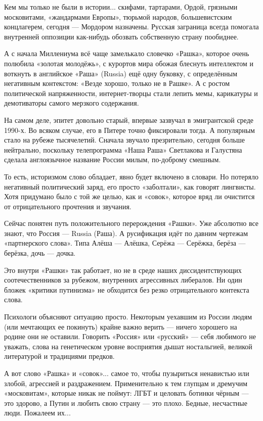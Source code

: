 Кем мы только не были в истории... скифами, тартарами, Ордой, грязными
московитами, «жандармами Европы», тюрьмой народов, большевистским концлагерем,
сегодня — Мордором назначены. Русская заграница всегда помогала внутренней
оппозиции как-нибудь обозвать собственную страну пообиднее.

А с начала Миллениума всё чаще замелькало словечко «Рашка», которое очень
полюбила «золотая молодёжь», с курортов мира обожая блеснуть интеллектом и
воткнуть в английское «Раша» (Russia) ещё одну буковку, с определённым
негативным контекстом: «Везде хорошо, только не в Рашке». А с ростом
политической напряженности, интернет-творцы стали лепить мемы, карикатуры и
демотиваторы самого мерзкого содержания.

На самом деле, эпитет довольно старый, впервые зазвучал в эмигрантской среде
1990-х. Во всяком случае, его в Питере точно фиксировали тогда. А популярным
стало на рубеже тысячелетий. Сначала звучало презрительно, сегодня больше
нейтрально, поскольку телепрограмма «Наша Раша» Светлакова и Галустяна сделала
англоязычное название России милым, по-доброму смешным.

То есть, историзмом слово обладает, явно будет включено в словари. Но потеряло
негативный политический заряд, его просто «заболтали», как говорят лингвисты.
Хотя придумано было с той же целью, как и «совок», которое вряд ли очистится от
отрицательного прочтения и звучания.

Сейчас понятен путь положительного перерождения «Рашки». Уже абсолютно все
знают, что Россия — Russia (Раша). А русификация идёт по давним чертежам
«партнерского слова». Типа Алёша — Алёшка, Серёжа — Серёжка, берёза — берёзка,
дочь — дочка.

Это внутри «Рашки» так работает, но не в среде наших диссидентствующих
соотечественников за рубежом, внутренних агрессивных либералов. Ни один бложек
«критики путинизма» не обходится без резко отрицательного контекста слова.


Психологи объясняют ситуацию просто. Некоторым уехавшим из России людям (или
мечтающих ее покинуть) крайне важно верить — ничего хорошего на родине они не
оставили. Говорить «Россия» или «русский» — себя любимого не уважать, слова на
генетическом уровне восприятия дышат ностальгией, великой литературой и
традициями предков.

А вот слово «Рашка» и «совок»... самое то, чтобы пузыриться ненавистью или
злобой, агрессией и раздражением. Применительно к тем глупцам и дремучим
«московитам», которые никак не поймут: ЛГБТ и целовать ботинки чёрным — это
здорово, а Путин и любить свою страну — это плохо. Бедные, несчастные люди.
Пожалеем их...

